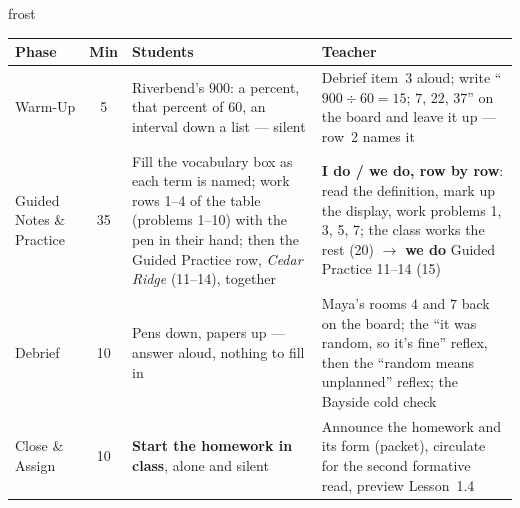 \documentclass[10pt]{article}
\begin{document}
\begin{fixedskillbox}{frost}
\renewcommand{\arraystretch}{1.25}
\begin{tabularx}{\linewidth}{@{}l c X X@{}}
\textbf{Phase} & \textbf{Min} & \textbf{Students} & \textbf{Teacher} \\
\hline
Warm-Up & 5 & Riverbend's $900$: a percent, that percent of $60$, an interval down a list ---
  silent & Debrief item~3 aloud; write ``$900 \div 60 = 15$; $7$, $22$, $37$'' on the board
  and leave it up --- row~2 names it \\
Guided Notes \& Practice & 35 & Fill the vocabulary box as each term is named; work rows
  1--4 of the table (problems 1--10) with the pen in their hand; then the Guided Practice row,
  \emph{Cedar Ridge} (11--14), together & \textbf{I do / we do, row by row}: read the
  definition, mark up the display, work problems 1, 3, 5, 7; the class works the rest (20)
  $\to$ \textbf{we do} Guided Practice 11--14 (15) \\
Debrief & 10 & Pens down, papers up --- answer aloud, nothing to fill in & Maya's rooms $4$
  and $7$ back on the board; the ``it was random, so it's fine'' reflex, then the
  ``random means unplanned'' reflex; the Bayside cold check \\
Close \& Assign & 10 & \textbf{Start the homework in class}, alone and silent & Announce the
  homework and its form (packet), circulate for the second formative read, preview
  Lesson~1.4 \\
\end{tabularx}
\end{fixedskillbox}
\end{document}
